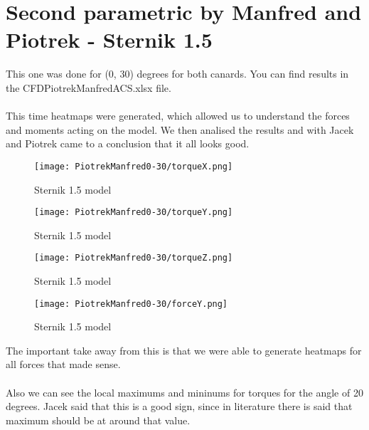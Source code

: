 \section{Second parametric by Manfred and Piotrek - Sternik 1.5}
This one was done for (0, 30) degrees for both canards. You can find results in the 
CFDPiotrekManfredACS.xlsx file. \\\\
This time heatmaps were generated, which allowed us to understand the forces and moments acting on
the model. We then analised the results and with Jacek and Piotrek came to a conclusion that
it all looks good.

\begin{figure}[H]
    \centering
    \texttt{[image: PiotrekManfred0-30/torqueX.png]}
    \caption{Sternik 1.5 model}
\end{figure}

\begin{figure}[H]
    \centering
    \texttt{[image: PiotrekManfred0-30/torqueY.png]}
    \caption{Sternik 1.5 model}
\end{figure}

\begin{figure}[H]
    \centering
    \texttt{[image: PiotrekManfred0-30/torqueZ.png]}
    \caption{Sternik 1.5 model}
\end{figure}

\begin{figure}[H]
    \centering
    \texttt{[image: PiotrekManfred0-30/forceY.png]}
    \caption{Sternik 1.5 model}
\end{figure}
The important take away from this is that we were able to generate heatmaps for all forces that
made sense. \\\\
Also we can see the local maximums and mininums for torques for the angle of 20 degrees. Jacek said
that this is a good sign, since in literature there is said that maximum should be at around that
value.
\newpage
